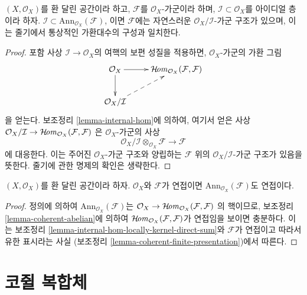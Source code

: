 \begin{lemma}
\label{lemma-induced-quotient-ring-sheaf-module-structure}
$(X, \mathcal{O}_X)$를 환 달린 공간이라 하고, $\mathcal{F}$를
$\mathcal{O}_X$-가군이라 하며, $\mathcal{I} \subset \mathcal{O}_X$를
아이디얼 층이라 하자.
$\mathcal{I} \subset \text{Ann}_{\mathcal{O}_X}(\mathcal{F})$,
이면 $\mathcal{F}$에는 자연스러운 $\mathcal{O}_X/\mathcal{I}$-가군 구조가
있으며, 이는 줄기에서 통상적인 가환대수의 구성과 일치한다.
\end{lemma}

\begin{proof}
포함 사상 $\mathcal{I} \to \mathcal{O}_X$의 여핵의 보편 성질을 적용하면,
$\mathcal{O}_X$-가군의 가환 그림
$$
\xymatrix{
\mathcal{O}_X \ar[r] \ar[d] &
\SheafHom_{\mathcal{O}_X}(\mathcal{F}, \mathcal{F}) \\
\mathcal{O}_X/\mathcal{I} \ar@{-->}[ur]
}
$$
을 얻는다. 보조정리 \ref{lemma-internal-hom}에 의하여, 여기서 얻은 사상
$\mathcal{O}_X/\mathcal{I} \to
\mathop{\mathcal{H}\!\mathit{om}}\nolimits_{\mathcal{O}_X}(\mathcal{F}, \mathcal{F})$
은 $\mathcal{O}_X$-가군의 사상
$$
\mathcal{O}_X/\mathcal{I} \otimes_{\mathcal{O}_X} \mathcal{F}
\longrightarrow
\mathcal{F}
$$
에 대응한다. 이는 주어진 $\mathcal{O}_X$-가군 구조와 양립하는
$\mathcal{F}$ 위의 $\mathcal{O}_X/\mathcal{I}$-가군 구조가 있음을 뜻한다.
줄기에 관한 명제의 확인은 생략한다.
\end{proof}

\begin{lemma}
\label{lemma-coherent-annihilator}
$(X,\mathcal{O}_X)$를 환 달린 공간이라 하자.
$\mathcal{O}_X$와 $\mathcal{F}$가 연접이면
$\text{Ann}_{\mathcal{O}_X}(\mathcal{F})$도 연접이다.
\end{lemma}

\begin{proof}
정의에 의하여 $\text{Ann}_{\mathcal{O}_X}(\mathcal{F})$는
$\mathcal{O}_X \to \mathop{\mathcal{H}\!\mathit{om}}\nolimits_{\mathcal{O}_X}(\mathcal{F}, \mathcal{F})$
의 핵이므로, 보조정리 \ref{lemma-coherent-abelian}에 의하여
$\mathop{\mathcal{H}\!\mathit{om}}\nolimits_{\mathcal{O}_X}(\mathcal{F}, \mathcal{F})$가 연접임을 보이면
충분하다. 이는 보조정리
\ref{lemma-internal-hom-locally-kernel-direct-sum}와
$\mathcal{F}$가 연접이고 따라서 유한 표시라는 사실
(보조정리 \ref{lemma-coherent-finite-presentation})에서 따른다.
\end{proof}





\section{코쥘 복합체}
\label{section-koszul-complex}

